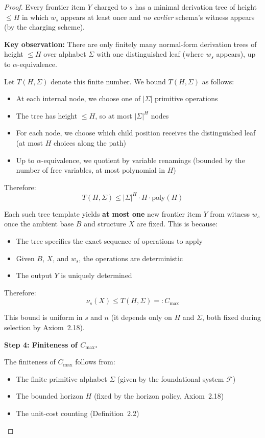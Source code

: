 \documentclass[11pt]{article}
\theoremstyle{definition}
\theoremstyle{remark}
\begin{document}
\begin{proof}
Every frontier item $Y$ charged to $s$ has a minimal derivation tree of height $\leq H$ in which $w_s$
appears at least once and \emph{no earlier} schema's witness appears (by the charging scheme).

\textbf{Key observation:} There are only finitely many normal-form derivation trees of height $\leq H$
over alphabet $\Sigma$ with one distinguished leaf (where $w_s$ appears), up to $\alpha$-equivalence.

Let $T(H,\Sigma)$ denote this finite number. We bound $T(H,\Sigma)$ as follows:

\begin{itemize}
\item At each internal node, we choose one of $|\Sigma|$ primitive operations
\item The tree has height $\leq H$, so at most $|\Sigma|^H$ nodes
\item For each node, we choose which child position receives the distinguished leaf (at most $H$
choices along the path)
\item Up to $\alpha$-equivalence, we quotient by variable renamings (bounded by the number of free
variables, at most polynomial in $H$)
\end{itemize}

Therefore:
\[
T(H,\Sigma) \leq |\Sigma|^H \cdot H \cdot \text{poly}(H)
\]

Each such tree template yields \textbf{at most one} new frontier item $Y$ from witness $w_s$ once
the ambient base $B$ and structure $X$ are fixed. This is because:

\begin{itemize}
\item The tree specifies the exact sequence of operations to apply
\item Given $B$, $X$, and $w_s$, the operations are deterministic
\item The output $Y$ is uniquely determined
\end{itemize}

Therefore:
\[
\nu_s(X) \leq T(H,\Sigma) =: C_{\max}
\]

This bound is uniform in $s$ and $n$ (it depends only on $H$ and $\Sigma$, both fixed during selection
by Axiom~2.18).

\textbf{Step 4: Finiteness of $C_{\max}$.}

The finiteness of $C_{\max}$ follows from:
\begin{itemize}
\item The finite primitive alphabet $\Sigma$ (given by the foundational system $\mathcal{F}$)
\item The bounded horizon $H$ (fixed by the horizon policy, Axiom~2.18)
\item The unit-cost counting (Definition~2.2)
\end{itemize}


\end{proof}
\end{document}

